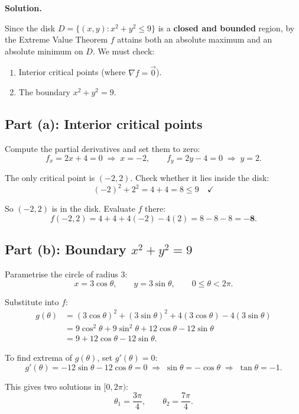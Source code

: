 \documentclass[12pt]{article}
\newcommand{\vect}[1]{\vec{#1}}
\newcommand{\grad}{\nabla}
\begin{document}
\textbf{Solution.}

\medskip
Since the disk $D = \{(x,y) : x^2+y^2 \le 9\}$ is a \textbf{closed and bounded}
region, by the Extreme Value Theorem $f$ attains both an absolute maximum and an
absolute minimum on $D$.  We must check:
\begin{enumerate}[label=(\alph*)]
  \item Interior critical points (where $\grad f = \vect{0}$).
  \item The boundary $x^2+y^2 = 9$.
\end{enumerate}

\subsection*{Part (a): Interior critical points}

Compute the partial derivatives and set them to zero:
\[
  f_x = 2x + 4 = 0 \;\Longrightarrow\; x = -2, \qquad
  f_y = 2y - 4 = 0 \;\Longrightarrow\; y = 2.
\]

The only critical point is $(-2, 2)$.  Check whether it lies inside the disk:
\[
  (-2)^2 + 2^2 = 4 + 4 = 8 \le 9 \quad \checkmark
\]

So $(-2,2)$ is in the disk. Evaluate $f$ there:
\[
  f(-2,2) = 4 + 4 + 4(-2) - 4(2) = 8 - 8 - 8 = \mathbf{-8}.
\]

\subsection*{Part (b): Boundary $x^2 + y^2 = 9$}

Parametrise the circle of radius $3$:
\[
  x = 3\cos \theta, \qquad y = 3\sin \theta, \qquad 0 \le \theta < 2\pi.
\]

Substitute into $f$:
\begin{align*}
  g(\theta) &= (3\cos \theta)^2 + (3\sin \theta)^2 + 4(3\cos \theta) - 4(3\sin \theta) \\
       &= 9\cos^2 \theta + 9\sin^2 \theta + 12\cos \theta - 12\sin \theta \\
       &= 9 + 12\cos \theta - 12\sin \theta.
\end{align*}

To find extrema of $g(\theta)$, set $g'(\theta) = 0$:
\[
  g'(\theta) = -12\sin \theta - 12\cos \theta = 0
  \;\Longrightarrow\;
  \sin \theta = -\cos \theta
  \;\Longrightarrow\;
  \tan \theta = -1.
\]

This gives two solutions in $[0, 2\pi)$:
\[
  \theta_1 = \frac{3\pi}{4}, \qquad \theta_2 = \frac{7\pi}{4}.
\]
\end{document}
